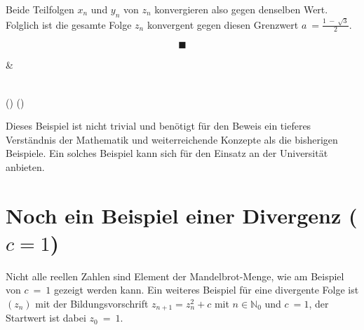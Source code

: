 \documentclass[a4paper, 12pt]{book}
\begin{document}
\begin{longtable}[]
\begin{minipage}[b]{\linewidth}
Beide Teilfolgen \(x_{n}\) und \(y_{n}\) von \(z_{n}\) konvergieren also
gegen denselben Wert. Folglich ist die gesamte Folge \(z_{n}\)
konvergent gegen diesen Grenzwert \(a\  = \frac{1\  - \ \sqrt{3}}{2}\).

\[\blacksquare\]
\end{minipage} & \begin{minipage}[b]{\linewidth}\raggedright
\end{minipage} \\
\midrule()
\endhead
\bottomrule()
\end{longtable}

Dieses Beispiel ist nicht trivial und benötigt für den Beweis ein
tieferes Verständnis der Mathematik und weiterreichende Konzepte als die
bisherigen Beispiele. Ein solches Beispiel kann sich für den Einsatz an
der Universität anbieten.

\section{Noch ein Beispiel einer Divergenz ($c=1$)}

Nicht alle reellen Zahlen sind Element der Mandelbrot-Menge, wie am
Beispiel von \(c\  = \ 1\) gezeigt werden kann. Ein weiteres Beispiel
für eine divergente Folge ist \(\left( z_{n} \right)\) mit der
Bildungsvorschrift \(z_{n + 1} = z_{n}^{2} + c\) mit
\(n \in \mathbb{N}_{0}\) und \(c\  = 1\), der Startwert ist dabei
\(z_{0}\  = \ 1\).
\end{document}
